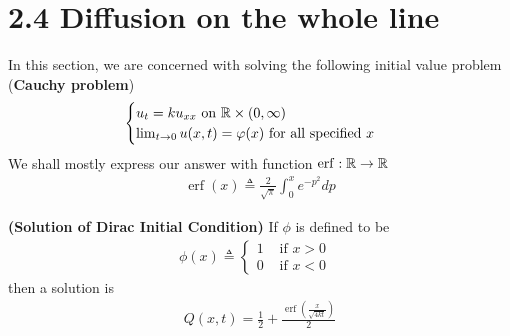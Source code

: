 \documentclass{report}
\begin{document}
\section{2.4 Diffusion on the whole line}
\begin{mdframed}
In this section, we are concerned with solving the following initial value problem (\textbf{Cauchy problem}) 
\begin{align*}
\begin{cases}
  u_t=ku_{xx}\text{ on }\mathbb{R} \times (0,\infty)\\
  \lim_{t\to 0}u(x,t)=\varphi (x)\text{ for all specified $x$ } 
\end{cases}
\end{align*}
We shall mostly express our answer with function $\operatorname{erf}:\mathbb{R}\rightarrow \mathbb{R}$  
\begin{align*}
\operatorname{erf}(x)\triangleq  \frac{2}{\sqrt{\pi}}\int_0^x e^{-p^2}dp
\end{align*}
\end{mdframed}
\begin{theorem}
\textbf{(Solution of Dirac Initial Condition)} If $\phi$ is defined to be 
\begin{align*}
\phi (x)\triangleq \begin{cases}
  1& \text{ if }x>0 \\
  0& \text{ if $x<0$ }
\end{cases}
\end{align*}
then a solution is 
\begin{align}
\label{sou}
Q(x,t)= \frac{1}{2}+ \frac{\operatorname{erf}(\frac{x}{\sqrt{4kt}})}{2}
\end{align}
\end{theorem}
\end{document}
